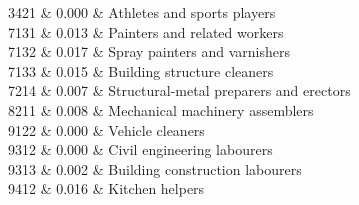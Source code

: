 3421 & 0.000 & Athletes and sports players \\

7131 & 0.013 & Painters and related workers \\

7132 & 0.017 & Spray painters and varnishers \\

7133 & 0.015 & Building structure cleaners \\

7214 & 0.007 & Structural-metal preparers and erectors \\

8211 & 0.008 & Mechanical machinery assemblers \\

9122 & 0.000 & Vehicle cleaners \\

9312 & 0.000 & Civil engineering labourers \\

9313 & 0.002 & Building construction labourers \\

9412 & 0.016 & Kitchen helpers \\

